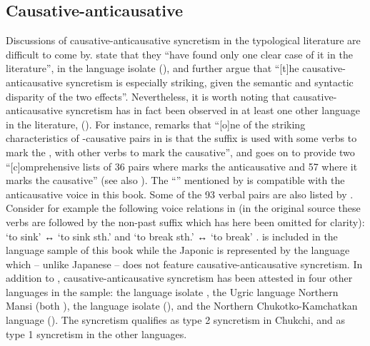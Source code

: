 \subsection{Causative-anticausative} \label{sec:simple-syncretism:caus-antc}
Discussions of causative-anticausative syncretism in the typological literature are difficult to come by. \cite[244]{zuniga:kittila:2019} state that they “have found only one clear case of it in the literature”, in the language isolate  (), and further argue that “[t]he causative-anticausative syncretism is especially striking, given the semantic and syntactic disparity of the two effects”. Nevertheless, it is worth noting that causative-anticausative syncretism has in fact been observed in at least one other language in the literature,  (). For instance, \cite[310]{comrie:2006} remarks that “[o]ne of the striking characteristics of -causative pairs in  is that the suffix  is used with some verbs to mark the , with other verbs to mark the causative”, and goes on to provide two “[c]omprehensive lists of 36 pairs where  marks the anticausative and 57 where it marks the causative” (see also \citealt[197ff.]{jacobsen:1982}). The “” mentioned by \citeauthor{comrie:2006} is compatible with the anticausative voice in this book. Some of the 93 verbal pairs are also listed by \cite[116]{haspelmath:1993}. Consider for example the following voice relations in  (in the original source these verbs are followed by the non-past suffix  which has here been omitted for clarity):  ‘to sink’ ↔  ‘to sink sth.’ and  ‘to break sth.’ ↔  ‘to break’ \citep[311f.]{comrie:2006}.  is included in the language sample of this book while the Japonic  is represented by the language  which -- unlike Japanese -- does not feature causative-anticausative syncretism. In addition to , causative-anticausative syncretism has been attested in four other languages in the sample: the language isolate , the Ugric language Northern Mansi (both ), the language isolate  (), and the Northern Chukotko-Kamchatkan language  (). The syncretism qualifies as type 2 syncretism in Chukchi, and as type 1 syncretism in the other languages.

